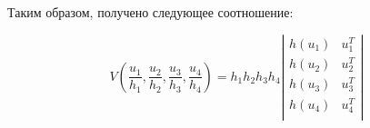 \documentclass[a4paper, 12pt, titlepage]{article}
\theoremstyle{definition}
\theoremstyle{plain}
\theoremstyle{plain}
\begin{document}
\begin{flushleft}
 Таким образом, получено следующее соотношение:

 \begin{equation}
  V \left(\frac{u_{1}}{h_{1}},
  \frac{u_{2}}{h_{2}},  \frac{u_{3}}{h_{3}}, \frac{u_{4}}{h_{4}}\right) =
  h_{1} h_{2} h_{3} h_{4}
  \left|\begin{array}{cc}
   h(u_{1}) & u_{1}^{T} \\
   h(u_{2}) & u_{2}^{T} \\
   h(u_{3}) & u_{3}^{T} \\
   h(u_{4}) & u_{4}^{T} \\
  \end{array}\right|
 \end{equation}


 \Square
\end{flushleft}


\newpage


\end{document}
